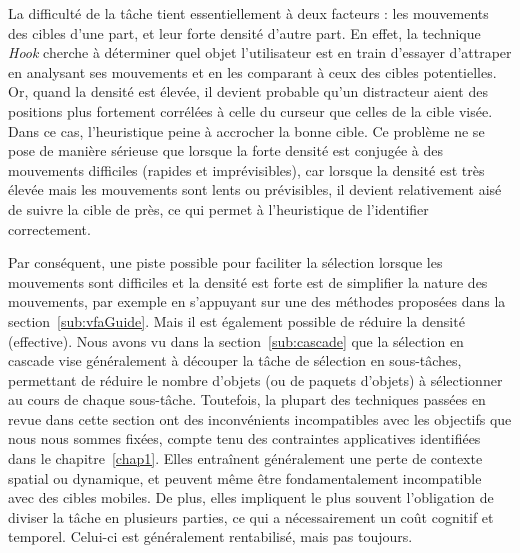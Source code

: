 	La difficulté de la tâche tient essentiellement à deux facteurs : les mouvements des cibles d'une part, et leur forte densité d'autre part. En effet, la technique \emph{Hook} cherche à déterminer quel objet l'utilisateur est en train d'essayer d'attraper en analysant ses mouvements et en les comparant à ceux des cibles potentielles. Or, quand la densité est élevée, il devient probable qu'un distracteur aient des positions plus fortement corrélées à celle du curseur que celles de la cible visée. Dans ce cas, l'heuristique peine à \og accrocher \fg{} la bonne cible. Ce problème ne se pose de manière sérieuse que lorsque la forte densité est conjugée à des mouvements difficiles (rapides et imprévisibles), car lorsque la densité est très élevée mais les mouvements sont lents ou prévisibles, il devient relativement aisé de suivre la cible de près, ce qui permet à l'heuristique de l'identifier correctement.
	
	Par conséquent, une piste possible pour faciliter la sélection lorsque les mouvements sont difficiles et la densité est forte est de simplifier la nature des mouvements, par exemple en s'appuyant sur une des méthodes proposées dans la section~\ref{sub:vfaGuide}. Mais il est également possible de réduire la densité (effective). Nous avons vu dans la section~\ref{sub:cascade} que la sélection en cascade vise généralement à découper la tâche de sélection en sous-tâches, permettant de réduire le nombre d'objets (ou de paquets d'objets) à sélectionner au cours de chaque sous-tâche. Toutefois, la plupart des techniques passées en revue dans cette section ont des inconvénients incompatibles avec les objectifs que nous nous sommes fixées, compte tenu des contraintes applicatives identifiées dans le chapitre~\ref{chap1}. Elles entraînent généralement une perte de contexte spatial ou dynamique, et peuvent même être fondamentalement incompatible avec des cibles mobiles. De plus, elles impliquent le plus souvent l'obligation de diviser la tâche en plusieurs parties, ce qui a nécessairement un coût cognitif et temporel. Celui-ci est généralement rentabilisé, mais pas toujours.
	
